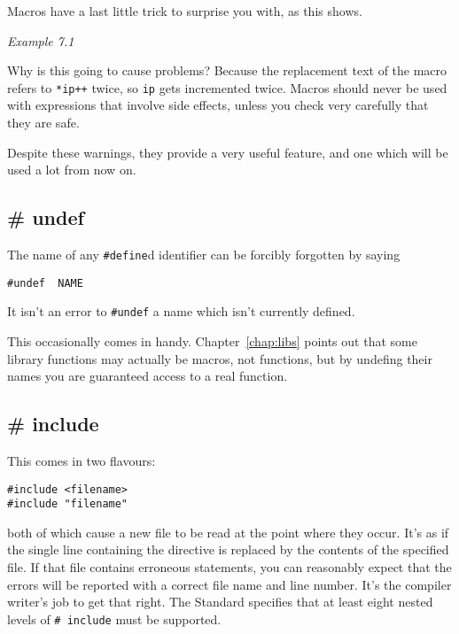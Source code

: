     Macros have a last little trick to surprise you with, as this
     shows.


    \begin{center}\textit{Example 7.1}\end{center}


    Why is this going to cause problems? Because the replacement text of
     the macro refers to \texttt{*ip++} twice, so \texttt{ip} gets
     incremented twice. Macros should never be used with expressions that
     involve side effects, unless you check very carefully that they are
     safe.


    Despite these warnings, they provide a very useful feature, and one
     which will be used a lot from now on.


   

  

  \subsection{\# undef}
   

   The name of any \texttt{\#define}d identifier can be forcibly
    forgotten by saying


   \begin{Verbatim}
#undef  NAME
\end{Verbatim}

   It isn't an error to \texttt{\#undef} a name which isn't currently
    defined.


   This occasionally comes in handy. Chapter~\ref{chap:libs} points out
    that some library functions may actually be macros, not functions, but
    by undefing their names you are guaranteed access to a real
    function.


  

  \subsection{\# include}
   

   This comes in two flavours:


   \begin{Verbatim}
#include <filename>
#include "filename"
\end{Verbatim}

   both of which cause a new file to be read at the point where they
    occur. It's as if the single line containing the directive is replaced
    by the contents of the specified file. If that file contains erroneous
    statements, you can reasonably expect that the errors will be reported
    with a correct file name and line number. It's the compiler writer's job
    to get that right. The Standard specifies that at least eight nested
    levels of \texttt{\# include} must be supported.


